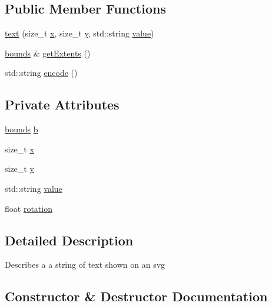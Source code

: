 \subsection*{Public Member Functions}
\begin{DoxyCompactItemize}
\item 
\hyperlink{classgraphics_1_1text_ab5001ed63efe9895cdef67b7f583176e}{text} (size\+\_\+t \hyperlink{classgraphics_1_1text_a5bd7f99e13dfc031dbf02f3a2a1cca75}{x}, size\+\_\+t \hyperlink{classgraphics_1_1text_adc8e738ee02fd453e16f4babf3e5dfaf}{y}, std\+::string \hyperlink{classgraphics_1_1text_a1dd8d9d9060ca92122c0ff18ccb00031}{value})
\item 
\hyperlink{classgraphics_1_1bounds}{bounds} \& \hyperlink{classgraphics_1_1text_ac17a62fe9b926674edf94fc5256b71ae}{get\+Extents} ()
\item 
std\+::string \hyperlink{classgraphics_1_1text_ac0490468cfb45df1daa8a4e959624164}{encode} ()
\end{DoxyCompactItemize}
\subsection*{Private Attributes}
\begin{DoxyCompactItemize}
\item 
\hyperlink{classgraphics_1_1bounds}{bounds} \hyperlink{classgraphics_1_1text_a79220736a8af6f8656434126da59de9f}{b}
\item 
size\+\_\+t \hyperlink{classgraphics_1_1text_a5bd7f99e13dfc031dbf02f3a2a1cca75}{x}
\item 
size\+\_\+t \hyperlink{classgraphics_1_1text_adc8e738ee02fd453e16f4babf3e5dfaf}{y}
\item 
std\+::string \hyperlink{classgraphics_1_1text_a1dd8d9d9060ca92122c0ff18ccb00031}{value}
\item 
float \hyperlink{classgraphics_1_1text_abee4722ae48b37b004069b10c0c99bea}{rotation}
\end{DoxyCompactItemize}


\subsection{Detailed Description}
Describes a a string of text shown on an svg 

\subsection{Constructor \& Destructor Documentation}
